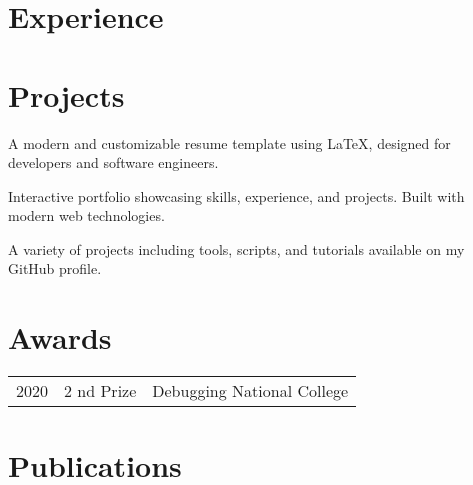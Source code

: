 \documentclass[]{azhagu-swe-resume-openfont}
\begin{document}
\hfill
\begin{minipage}[t]{0.66\textwidth} 


\section{Experience}
\sectionsep



\section{Projects}

A modern and customizable resume template using LaTeX, designed for developers and software engineers.
\sectionsep

Interactive portfolio showcasing skills, experience, and projects. Built with modern web technologies.
\sectionsep

A variety of projects including tools, scripts, and tutorials available on my GitHub profile.



\section{Awards} 
\begin{tabular}{rll}
2020	     &  2 nd Prize  &Debugging National College\\
\end{tabular}
\sectionsep


\section{Publications} 
\renewcommand\refname{\vskip -1.5em} 


\nocite{*}

\end{minipage} 
\end{document}

